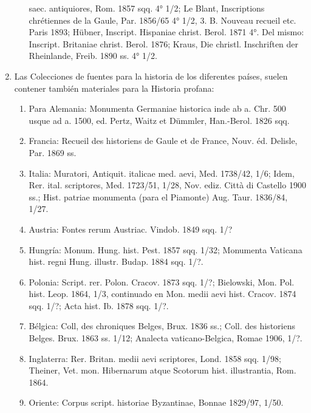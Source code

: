 \raggedbottom{} \documentclass[12pt, a4paper]{book}
\begin{document}
\begin{enumerate}
\begin{enumerate}
                saec. antiquiores, Rom. 1857 sqq. 4° 1/2; Le Blant, Inscriptions chrétiennes
                de la Gaule, Par. 1856/65 4° 1/2, 3. B. Nouveau recueil etc. Paris 1893;
                Hübner, Inscript. Hispaniae christ. Berol. 1871 4°. Del mismo: Inscript. Britaniae christ. Berol. 1876; Kraus, Die christl. Inschriften der Rheinlande,
                Freib. 1890 ss. 4° 1/2.
        \end{enumerate}
  \item Las Colecciones de fuentes para la historia de los diferentes países, suelen contener también materiales para la Historia profana:\begin{enumerate}
          \item Para Alemania: Monumenta Germaniae historica inde ab a. Chr. 500 usque ad a. 1500,
                ed. Pertz, Waitz et Dümmler, Han.-Berol. 1826 sqq.
          \item Francia: Recueil
                des historiens de Gaule et de France, Nouv. éd. Delisle, Par. 1869 ss.
          \item Italia: Muratori, Antiquit. italicae med. aevi, Med. 1738/42, 1/6; Idem,
                Rer. ital. scriptores, Med. 1723/51, 1/28, Nov. ediz. Città di Castello
                1900 ss.; Hist. patriae monumenta (para el Piamonte) Aug. Taur. 1836/84,
                1/27.
          \item Austria: Fontes rerum Austriac. Vindob. 1849 sqq. 1/?
          \item Hungría:
                Monum. Hung. hist. Pest. 1857 sqq. 1/32; Monumenta Vaticana hist. regni
                Hung. illustr. Budap. 1884 sqq. 1/?.
          \item Polonia: Script. rer. Polon. Cracov.
                1873 sqq. 1/?; Bielowski, Mon. Pol. hist. Leop. 1864, 1/3, continuado en
                Mon. medii aevi hist. Cracov. 1874 sqq. 1/?; Acta hist. Ib. 1878 sqq. 1/?.
          \item Bélgica: Coll, des chroniques Belges, Brux. 1836 ss.; Coll. des historiens Belges. Brux. 1863 ss. 1/12; Analecta vaticano-Belgica, Romae 1906,
                1/?.
          \item Inglaterra: Rer. Britan. medii aevi scriptores, Lond. 1858 sqq. 1/98;
                Theiner, Vet. mon. Hibernarum atque Scotorum hist. illustrantia, Rom. 1864.
          \item Oriente: Corpus script. historiae Byzantinae, Bonnae 1829/97, 1/50.
        \end{enumerate}
\end{enumerate}
\end{document}
